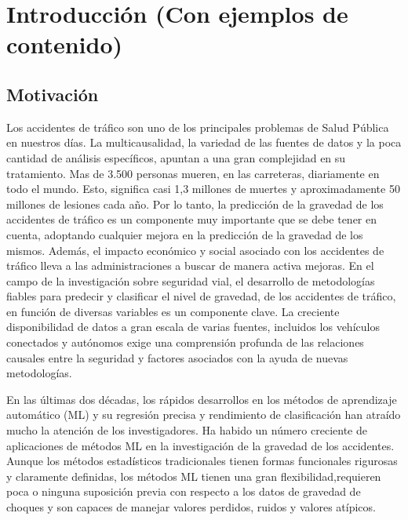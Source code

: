 
\chapter{Introducción (Con ejemplos de contenido)}

\section {Motivación}


	Los accidentes de tráﬁco son uno de los principales problemas de Salud Pública en nuestros días. La multicausalidad, la variedad de las fuentes de datos y la poca cantidad de análisis especíﬁcos, apuntan a una gran complejidad en su tratamiento. Mas de 3.500 personas mueren, en las carreteras, diariamente en todo el mundo. Esto, signiﬁca casi 1,3 millones de muertes y aproximadamente 50 millones de lesiones cada año. Por lo tanto, la predicción de la gravedad de los accidentes de tráﬁco es un componente muy importante que se debe tener en cuenta, adoptando cualquier mejora en la predicción de la gravedad de los mismos. Además, el impacto económico y social asociado con los accidentes de tráﬁco lleva a las administraciones a buscar de manera activa mejoras.
	En el campo de la investigación sobre seguridad vial, el desarrollo de metodologías ﬁables para predecir y clasiﬁcar el nivel de gravedad, de los accidentes de tráﬁco, en función de diversas variables es un componente clave. La creciente disponibilidad de datos a gran escala de varias fuentes, incluidos los vehículos conectados y autónomos exige una comprensión profunda de las relaciones causales entre la seguridad y factores asociados con la ayuda de nuevas metodologías.

	En las últimas dos décadas, los rápidos desarrollos en los métodos de aprendizaje automático (ML) y su regresión precisa y rendimiento de clasiﬁcación han atraído mucho la atención de los investigadores. Ha habido un número creciente de aplicaciones de métodos ML en la investigación de la gravedad de los accidentes. Aunque los métodos estadísticos tradicionales tienen formas funcionales rigurosas y claramente deﬁnidas, los métodos ML tienen una gran ﬂexibilidad,requieren poca o ninguna suposición previa con respecto a los datos de gravedad de choques y son capaces de manejar valores perdidos, ruidos y valores atípicos.

